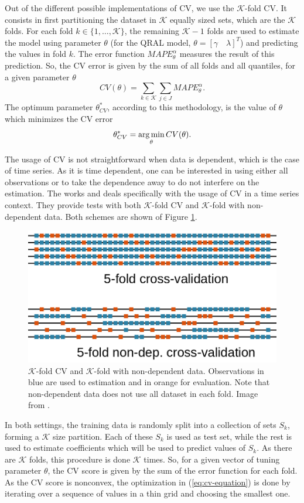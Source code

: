 Out of the different possible implementations of CV, we use the $\mathcal{K}$-fold CV. It consists in first partitioning the dataset in $\mathcal{K}$ equally sized sets, which are the $\mathcal{K}$ folds. For each fold $k \in \{1,\dots,\mathcal{K}\}$, the remaining $\mathcal{K}-1$ folds are used to estimate the model using parameter $\theta$ (for the QRAL model, $\theta = [\gamma \quad \lambda]^T$) and predicting the values in fold $k$. The error function $MAPE^\alpha_\theta$ measures the result of this prediction.
So, the CV error is given by the sum of all folds and all quantiles, for a given parameter $\theta$
\[
 CV(\theta) = \sum_{k \in \mathcal{K}} \sum_{j \in J} MAPE^\alpha_\theta.\label{eq:cv-error}
\]
The optimum parameter $\theta^*_{CV}$, according to this methodology, is the value of $\theta$ which minimizes the CV error
\begin{equation}
\theta_{CV}^* = \argmin_\theta CV(\theta) .\label{eq:cv-equation}
\end{equation}

The usage of CV is not straightforward when data is dependent, which is the case of time series. As it is time dependent, one can be interested in using either all observations or to take the dependence away to do not interfere on the estimation. The works
\cite{bergmeir_note_2017} and \cite{bergmeir_use_2012} deals specifically with the usage of CV in a time series context. They provide tests with both $\mathcal{K}$-fold CV and $\mathcal{K}$-fold with non-dependent data. Both schemes are shown of Figure \ref{fig:cross-validation-scheme}.
\begin{figure}
	\centering
	\includegraphics[width=0.7\linewidth]{Images/Cross-validation-scheme}
	\caption{$\mathcal{K}$-fold CV and $\mathcal{K}$-fold with non-dependent data. Observations in blue are used to estimation and in orange for evaluation. Note that non-dependent data does not use all dataset in each fold. Image from \cite{bergmeir_note_2017}.}
	\label{fig:cross-validation-scheme}
\end{figure}
In both settings, the training data is randomly split into a collection of sets $S_k$, forming a $\mathcal{K}$ size partition. Each of these $S_k$ is used as test set, while the rest is used to estimate coefficients which will be used to predict values of $S_k$. 
As there are $\mathcal{K}$ folds, this procedure is done $\mathcal{K}$ times. 
So, for a given vector of tuning parameter $\theta$, the CV score is given by the sum of the error function for each fold. 
As the CV score is nonconvex, the optimization in (\ref{eq:cv-equation}) is done by iterating over a sequence of values in a thin grid and choosing the smallest one.



